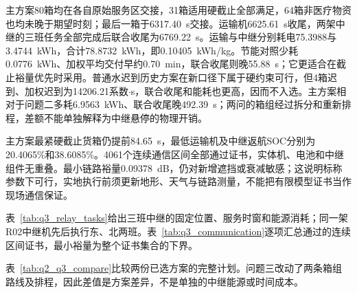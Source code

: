 \begin{table}[H]\centering\small\caption{联合调度候选：均满足医疗、首批与通信硬约束；时间单位为分钟}\label{tab:q3}
\end{table}

主方案80箱均在各自原始服务区交接，31箱适用硬截止全部满足，64箱非医疗物资也均未晚于期望时刻；最后一箱于6317.40~s交接。运输机6625.61~s收尾，两架中继的三班任务全部完成后联合收尾为6769.22~s。运输与中继分别耗电75.3988与3.4744~kWh，合计78.8732~kWh，即0.10405~kWh/kg。节能对照少耗0.0776~kWh、加权平均交付早约0.70~min，联合收尾则晚55.88~s；它更适合在截止裕量优先时采用。普通水迟到历史方案在新口径下属于硬约束可行，但4箱迟到、加权迟到为14206.21系数$\cdot$s，联合收尾和能耗也更高，因而不入选。主方案相对于问题二多耗6.9563~kWh、联合收尾晚492.39~s；两问的箱组经过拆分和重新排程，差额不能单独解释为中继悬停的物理开销。

主方案最紧硬截止货箱仍提前84.65~s，最低运输机及中继返航SOC分别为20.4065\%和38.6085\%。4061个连续通信区间全部通过证书，实体机、电池和中继组件无重叠。最小链路裕量0.09378~dB，仍对新增遮挡或衰减敏感；这说明标称参数下可行，实地执行前须更新地形、天气与链路测量，不能把有限模型证书当作现场通信保证。

表~\ref{tab:q3_relay_tasks}给出三班中继的固定位置、服务时窗和能源消耗；同一架R02中继机先后执行东、北两班。表~\ref{tab:q3_communication}逐项汇总通过的连续区间证书，最小裕量为整个证书集合的下界。



表~\ref{tab:q2_q3_compare}比较两份已选方案的完整计划。问题三改动了两条箱组路线及排程，因此差值是方案差异，不是单独的中继能源或时间成本。


